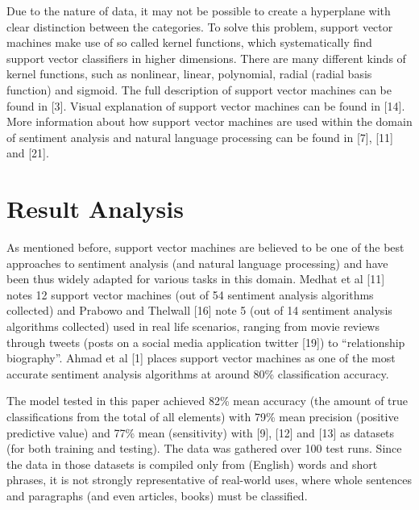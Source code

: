 \documentclass[12pt,journal,compsoc]{IEEEtran}
\begin{document}
Due to the nature of data, it may not be possible to create a hyperplane with clear distinction between the categories. To solve this problem, support vector machines make use of so called kernel functions, which systematically find support vector classifiers in higher dimensions. There are many different kinds of kernel functions, such as nonlinear, linear, polynomial, radial (radial basis function) and sigmoid.
The full description of support vector machines can be found in [3]. Visual explanation of support vector machines can be found in [14]. More information about how support vector machines are used within the domain of sentiment analysis and natural language processing can be found in [7], [11] and [21].

\section{Result Analysis}
As mentioned before, support vector machines are believed to be one of the best approaches to sentiment analysis (and natural language processing) and have been thus widely adapted for various tasks in this domain. Medhat et al [11] notes 12 support vector machines (out of 54 sentiment analysis algorithms collected) and Prabowo and Thelwall [16] note 5 (out of 14 sentiment analysis algorithms collected) used in real life scenarios, ranging from movie reviews through tweets (posts on a social media application twitter [19]) to “relationship biography”. Ahmad et al [1] places support vector machines as one of the most accurate sentiment analysis algorithms at around 80\% classification accuracy.

The model tested in this paper achieved 82\% mean accuracy (the amount of true classifications from the total of all elements) with 79\% mean precision (positive predictive value) and 77\% mean (sensitivity) with [9], [12] and [13] as datasets (for both training and testing). The data was gathered over 100 test runs. Since the data in those datasets is compiled only from (English) words and short phrases, it is not strongly representative of real-world uses, where whole sentences and paragraphs (and even articles, books) must be classified.
\end{document}
